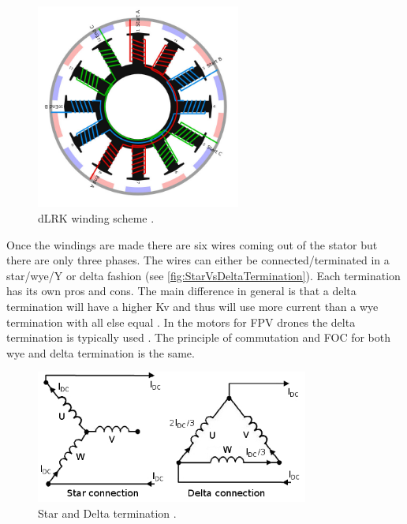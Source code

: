 \documentclass[]{report}
\begin{document}
\begin{figure}[H]
	\centering
	\includegraphics[width=0.6\textwidth]{dLRK.jpg}
	\caption{dLRK winding scheme \cite{CommonBldcWindingSchemes}.}
	\label{fig:dLrkWindingScheme}
\end{figure}

Once the windings are made there are six wires coming out of the stator but there are only three phases. The wires can either be connected/terminated in a star/wye/Y or delta fashion (see \autoref{fig:StarVsDeltaTermination}). Each termination has its own pros and cons. The main difference in general is that a delta termination will have a higher Kv and thus will use more current than a wye termination with all else equal \cite{StarVsDeltaTermination_Kv}. In the motors for FPV drones the delta termination is typically used \cite{FpvBldcWindingSchema}. The principle of commutation and FOC for both wye and delta termination is the same.

\begin{figure}[H]
	\centering
	\includegraphics[width=0.8\textwidth]{BLDC_star_delta.jpg}
	\caption{Star and Delta termination \cite{StarVsDeltaTermination}.}
	\label{fig:StarVsDeltaTermination}
\end{figure}
\end{document}
